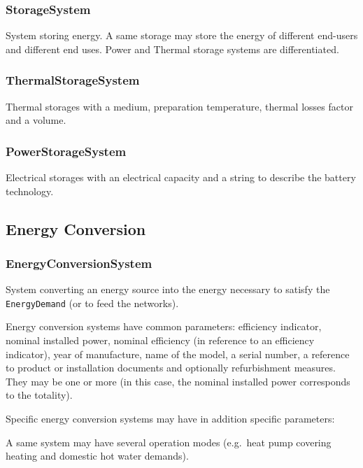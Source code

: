 \documentclass[a4paper,12pt]{article}
\begin{document}
\subsubsection{StorageSystem}\label{storagesystem}

System storing energy. A same storage may store the energy of different
end-users and different end uses. Power and Thermal storage systems are
differentiated.

\subsubsection{ThermalStorageSystem}\label{thermalstoragesystem}

Thermal storages with a medium, preparation temperature, thermal losses
factor and a volume.

\subsubsection{PowerStorageSystem}\label{powerstoragesystem}

Electrical storages with an electrical capacity and a string to describe
the battery technology.

\subsection{Energy Conversion}\label{energy-conversion}

\subsubsection{EnergyConversionSystem}\label{energyconversionsystem}

System converting an energy source into the energy necessary to satisfy
the \texttt{EnergyDemand} (or to feed the networks).

Energy conversion systems have common parameters: efficiency indicator,
nominal installed power, nominal efficiency (in reference to an
efficiency indicator), year of manufacture, name of the model, a serial
number, a reference to product or installation documents and optionally
refurbishment measures. They may be one or more (in this case, the
nominal installed power corresponds to the totality).

Specific energy conversion systems may have in addition specific
parameters:

A same system may have several operation modes (e.g.~heat pump covering
heating and domestic hot water demands).
\end{document}
